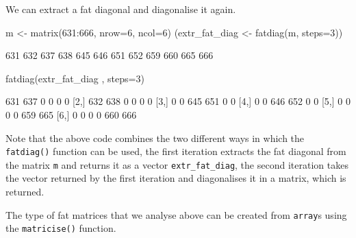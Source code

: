 \documentclass[article]{jss}
\begin{document}
We can extract a fat diagonal and diagonalise it again.

\begin{CodeChunk}
\begin{CodeInput}
m <- matrix(631:666, nrow=6, ncol=6)
(extr_fat_diag <- fatdiag(m, steps=3))
\end{CodeInput}
\begin{CodeOutput}
 [1] 631 632 637 638 645 646 651 652 659 660 665 666
\end{CodeOutput}
\begin{CodeInput}
fatdiag(extr_fat_diag , steps=3)
\end{CodeInput}
\begin{CodeOutput}
     [,1] [,2] [,3] [,4] [,5] [,6]
[1,]  631  637    0    0    0    0
[2,]  632  638    0    0    0    0
[3,]    0    0  645  651    0    0
[4,]    0    0  646  652    0    0
[5,]    0    0    0    0  659  665
[6,]    0    0    0    0  660  666
\end{CodeOutput}
\end{CodeChunk}

Note that the above code combines the two different ways in which the
\texttt{fatdiag()} function can be used, the first iteration extracts
the fat diagonal from the matrix \texttt{m} and returns it as a vector
\texttt{extr\_fat\_diag}, the second iteration takes the vector returned
by the first iteration and diagonalises it in a matrix, which is
returned.

The type of fat matrices that we analyse above can be created from
\texttt{array}s using the \texttt{matricise()} function.
\end{document}
